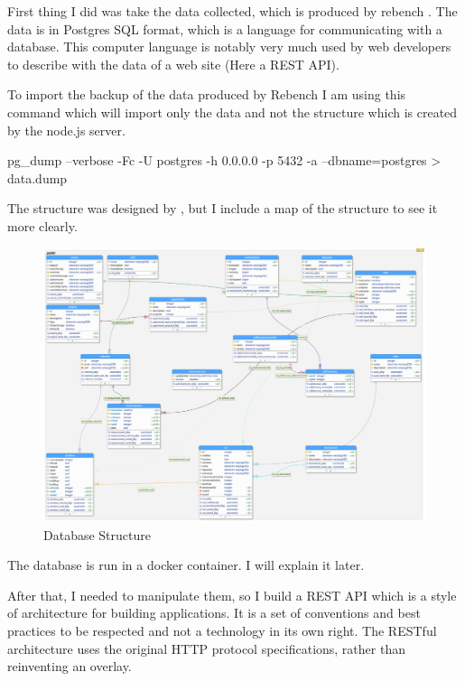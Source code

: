 \documentclass{article}
\begin{document}
First thing I did was take the data collected, which is produced by rebench \citep{ReBench:2018}. The data is in Postgres SQL format, which is a language for communicating with a database. This computer language is notably very much used by web developers to describe with the data of a web site (Here a REST API).

To import the backup of the data produced by Rebench I am using this command which will import only the data and not the structure which is created by the node.js server.

\begin{python}[h!]
pg_dump --verbose -Fc -U postgres -h 0.0.0.0 -p 5432  -a --dbname=postgres > data.dump
\end{python}

The structure was designed by \citep{ReBench:2018}, but I include a map of the structure to see it more clearly.


\begin{figure}[h!]
    \centering
    \includegraphics[width=1\textwidth]{images/database.png}
    \caption{Database Structure}
    \label{fig:database}
\end{figure}

The database is run in a docker container. I will explain it later.

After that, I needed to manipulate them, so I build a REST API which is a style of architecture for building applications. It is a set of conventions and best practices to be respected and not a technology in its own right. The RESTful architecture uses the original HTTP protocol specifications, rather than reinventing an overlay.
\end{document}
